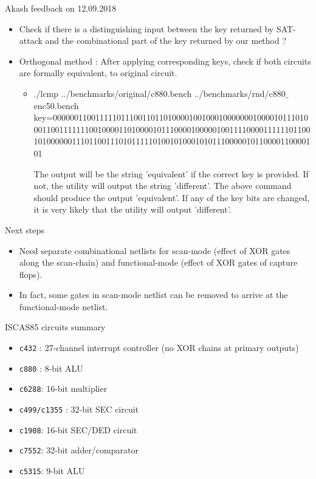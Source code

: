 \begin{frame}{Akash feedback on 12.09.2018}
\begin{itemize}
\item Check if there is a distinguishing input between the key returned by SAT-attack and the combinational part of the key returned by our method ?
\item \alert{Orthogonal method} : After applying corresponding keys, check if both circuits are \alert{formally equivalent}, to original circuit. 
	\begin{itemize}
		\item ./lcmp ../benchmarks/original/c880.bench ../benchmarks/rnd/c880$\_$enc50.bench key=000000110011111011100110110100001001000100000001000010111010001100111111100100001101000010111000010000010011110000111111011001010000001110110011101011111010010100010101110000010110000110000101

The output will be the string 'equivalent' if the correct key is provided. If not, the utility will output the string 'different'. The above command should produce the output 'equivalent'. If any of the key bits are changed, it is very likely that the utility will output 'different'.
	\end{itemize}
\end{itemize}
\end{frame}

\begin{frame}{Next steps}
	\begin{itemize}
		\item Need \alert{separate} combinational netlists for \alert{scan-mode} (effect of XOR gates along the scan-chain) and \alert{functional-mode} (effect of XOR gates of capture flops). 
		\item In fact, some gates in scan-mode netlist can be removed to arrive at the functional-mode netlist. 
	\end{itemize}
\end{frame}

\begin{frame}{ISCAS85 circuits summary}
\begin{itemize}
\item \texttt{c432} : 27-channel interrupt controller (no XOR chains at primary outputs)
\item \texttt{c880} : 8-bit ALU
\item \texttt{c6288}: 16-bit multiplier
\item \texttt{c499/c1355} : 32-bit SEC circuit
\item \texttt{c1908}: 16-bit SEC/DED circuit
\item \texttt{c7552}: 32-bit adder/comparator
\item \texttt{c5315}: 9-bit ALU
\end{itemize}
\end{frame}

